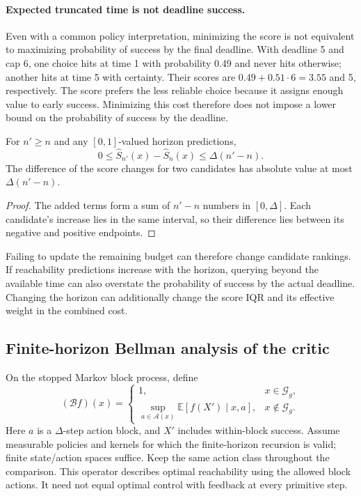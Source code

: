 \documentclass{article} %
\newcommand{\EE}{\mathbb E}
\newcommand{\Aset}{\mathcal A}
\theoremstyle{definition}
\theoremstyle{remark}
\begin{document}
\paragraph{Expected truncated time is not deadline success.}
Even with a common policy interpretation, minimizing the score is not equivalent to
maximizing probability of success by the final deadline.
With deadline 5 and cap 6, one choice hits at time 1 with probability 0.49 and never
hits otherwise; another hits at time 5 with certainty.
Their scores are $0.49+0.51\cdot6=3.55$ and 5, respectively.
The score prefers the less reliable choice because it assigns enough value to early success.
Minimizing this cost therefore does not impose a lower bound on the probability of
success by the deadline.

\begin{corollary}
\label{cor:clock}
For $n'\ge n$ and any $[0,1]$-valued horizon predictions,
\[
 0\le \widehat S_{n'}(x)-\widehat S_n(x)\le\Delta(n'-n).
\]
The difference of the score changes for two candidates has absolute value at most
$\Delta(n'-n)$.
\end{corollary}
\begin{proof}
The added terms form a sum of $n'-n$ numbers in $[0,\Delta]$.
Each candidate's increase lies in the same interval, so their difference lies between
its negative and positive endpoints.
\end{proof}
Failing to update the remaining budget can therefore change candidate rankings.
If reachability predictions increase with the horizon, querying beyond the available
time can also overstate the probability of success by the actual deadline.
Changing the horizon can additionally change the score IQR and its effective weight
in the combined cost.

\subsection{Finite-horizon Bellman analysis of the critic}
\label{app:critic-proof}
On the stopped Markov block process, define
\begin{equation}
 (\mathcal Bf)(x)=
 \begin{cases}
  1,&x\in\mathcal G_g,\\
  \sup_{a\in\Aset(x)}\EE[f(X')\mid x,a],&x\notin\mathcal G_g .
 \end{cases}
 \label{eq:bellman}
\end{equation}
Here $a$ is a $\Delta$-step action block, and $X'$ includes within-block success.
Assume measurable policies and kernels for which the finite-horizon recursion is
valid; finite state/action spaces suffice. Keep the same action class throughout the comparison.
This operator describes optimal reachability using the allowed block actions.
It need not equal optimal control with feedback at every primitive step.
\end{document}
